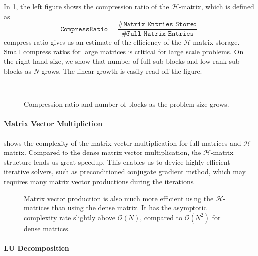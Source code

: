 \documentclass[3p,,preprint,12pt]{elsarticle}
\theoremstyle{definition}
\begin{document}
In \cref{fig:compress}, the left figure shows the compression ratio of the $\mathcal{H}$-matrix, which is defined as
\begin{equation}
\texttt{CompressRatio}=\frac{\#\texttt{Matrix Entries Stored}}{\#\texttt{Full Matrix Entries}}
\end{equation}
compress ratio gives us an estimate of the efficiency of the $\mathcal{H}$-matrix storage. Small compress ratios for large matrices is critical for large scale problems. On the right hand size, we show that number of full sub-blocks and low-rank sub-blocks as $N$ grows. The linear growth is easily read off the figure. 

\begin{figure}[htpb]
\centering
\scalebox{0.4}{}~
\scalebox{0.4}{}~
\caption{Compression ratio and number of blocks as the problem size grows.}
\label{fig:compress}
\end{figure}



\paragraph{Matrix Vector Multipliction}

 shows the complexity of the matrix vector multiplication for full matrices and $\mathcal{H}$-matrix. Compared to the dense matrix vector multiplication, the $\mathcal{H}$-matrix structure lends us great speedup. This enables us to device highly efficient iterative solvers, such as preconditioned conjugate gradient method, which may requires many matrix vector productions during the iterations.  

\begin{figure}[htpb]
\centering
\scalebox{0.6}{}
\caption{Matrix vector production is also much more efficient using the $\mathcal{H}$-matrices than using the dense matrix. It has the asymptotic complexity rate slightly above $\mathcal{O}(N)$, compared to $\mathcal{O}(N^2)$ for dense matrices. }
\label{fig:matvec}
\end{figure}


\paragraph{LU Decomposition}
\end{document}
